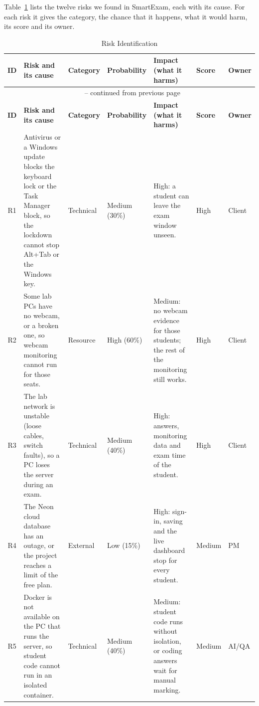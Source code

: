 Table~\ref{tab:risk_ident} lists the twelve risks we found in SmartExam, each with its cause. For each risk it gives the category, the chance that it happens, what it would harm, its score and its owner.

{\footnotesize\setlength{\tabcolsep}{3pt}\renewcommand{\arraystretch}{1.15}
\begin{longtable}{@{}c>{\raggedright\arraybackslash}p{4.25cm}>{\raggedright\arraybackslash}p{1.65cm}>{\raggedright\arraybackslash}p{2.0cm}>{\raggedright\arraybackslash}p{3.55cm}>{\centering\arraybackslash}p{1.3cm}>{\raggedright\arraybackslash}p{1.2cm}@{}}
\caption{Risk Identification}\label{tab:risk_ident}\\
\hline\hline
\textbf{ID} & \textbf{Risk and its cause} & \textbf{Category} & \textbf{Probability} & \textbf{Impact (what it harms)} & \textbf{Score} & \textbf{Owner} \\
\hline
\endfirsthead
\multicolumn{7}{c}{\tablename~\thetable{} -- continued from previous page}\\
\hline\hline
\textbf{ID} & \textbf{Risk and its cause} & \textbf{Category} & \textbf{Probability} & \textbf{Impact (what it harms)} & \textbf{Score} & \textbf{Owner} \\
\hline
\endhead
\hline\hline
\endlastfoot
R1 & Antivirus or a Windows update blocks the keyboard lock or the Task Manager block, so the lockdown cannot stop Alt+Tab or the Windows key. & Technical & Medium (30\%) & High: a student can leave the exam window unseen. & 6 High & Client \\
R2 & Some lab PCs have no webcam, or a broken one, so webcam monitoring cannot run for those seats. & Resource & High (60\%) & Medium: no webcam evidence for those students; the rest of the monitoring still works. & 6 High & Client \\
R3 & The lab network is unstable (loose cables, switch faults), so a PC loses the server during an exam. & Technical & Medium (40\%) & High: answers, monitoring data and exam time of the student. & 6 High & Client \\
R4 & The Neon cloud database has an outage, or the project reaches a limit of the free plan. & External & Low (15\%) & High: sign-in, saving and the live dashboard stop for every student. & 3 Medium & PM \\
R5 & Docker is not available on the PC that runs the server, so student code cannot run in an isolated container. & Technical & Medium (40\%) & Medium: student code runs without isolation, or coding answers wait for manual marking. & 4 Medium & AI/QA \\

\end{longtable}}

